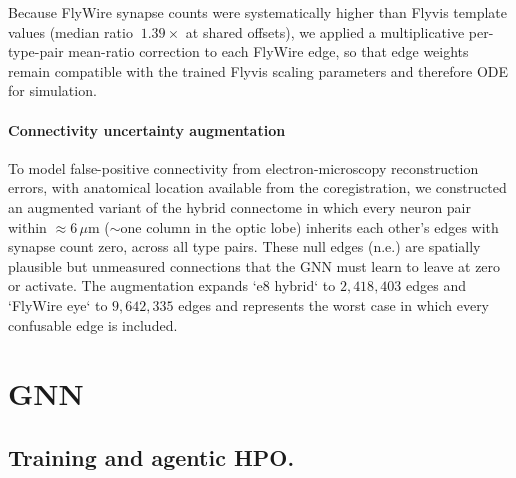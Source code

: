 \documentclass{article}
\begin{document}
Because FlyWire synapse counts were systematically higher than Flyvis template values (median ratio $~ 1.39\times$ at shared offsets), we applied a multiplicative per-type-pair mean-ratio correction to each FlyWire edge, so that edge weights remain compatible with the trained Flyvis scaling parameters and therefore ODE for simulation.



\paragraph{Connectivity uncertainty augmentation}

To model false-positive connectivity from electron-microscopy reconstruction errors, with anatomical location available from the coregistration, we constructed an augmented variant of the hybrid connectome in which every neuron pair within $\approx 6\,\mu\text{m}$ ($\sim$one column in the optic lobe) inherits
each other's edges with synapse count zero, across all type
pairs. These null edges (n.e.) are spatially plausible but
unmeasured connections that the GNN must learn to leave at zero or
activate. The augmentation expands `e8 hybrid` to $2{,}418{,}403$ edges and `FlyWire eye` to $9{,}642{,}335$ edges and represents the worst case in
which every confusable edge is included. 


\section{GNN}
\label{app:GNN}
\subsection{Training and agentic HPO.}
\label{app:gnn-training}
\end{document}
